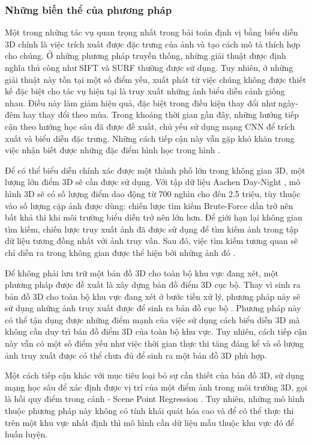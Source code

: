 \subsubsection*{Những biến thể của phương pháp}

Một trong những tác vụ quan trọng nhất trong bài toán định vị bằng biểu diễn 3D chính là việc trích xuất được đặc trưng của ảnh và tạo cách mô tả thích hợp cho chúng. Ở những phương pháp truyền thống, những giải thuật được định nghĩa thủ công như SIFT \cite{lowe2004distinctive} và SURF \cite{bay2006surf} thường được sử dụng. Tuy nhiên, ở những giải thuật này tồn tại một số điểm yếu, xuất phát từ việc chúng không được thiết kế đặc biệt cho tác vụ hiện tại là truy xuất những ảnh biểu diễn cảnh giống nhau. Điều này làm giảm hiệu quả, đặc biệt trong điều kiện thay đổi như ngày-đêm hay thay đổi theo mùa. Trong khoảng thời gian gần đây, những hướng tiếp cận theo hướng học sâu đã được đề xuất, chủ yếu sử dụng mạng CNN để trích xuất và biểu diễn đặc trưng. Những cách tiếp cận này vẫn gặp khó khăn trong việc nhận biết được những đặc điểm hình học trong hình \cite{zhou2020learn}.

Để có thể biểu diễn chính xác được một thành phố lớn trong không gian 3D, một lượng lớn điểm 3D sẽ cần được sử dụng. Với tập dữ liệu Aachen Day-Night \cite{sattler2018benchmarking}, mô hình 3D sẽ có số lượng điểm dao động từ 700 nghìn cho đến 2.5 triệu, tùy thuộc vào số lượng cặp ảnh được dùng: chiến lược tìm kiếm Brute-Force dần trở nên bất khả thi khi môi trường biểu diễn trở nên lớn hơn. Để giới hạn lại không gian tìm kiếm, chiến lược truy xuất ảnh đã được sử dụng để tìm kiếm ảnh trong tập dữ liệu tương đồng nhất với ảnh truy vấn. Sau đó, việc tìm kiếm tương quan sẽ chỉ diễn ra trong không gian được thể hiện bởi những ảnh đó \cite{sarlin2019coarse}.

Để không phải lưu trữ một bản đồ 3D cho toàn bộ khu vực đang xét, một phương pháp được đề xuất là xây dựng bản đồ điểm 3D cục bộ. Thay vì sinh ra bản đồ 3D cho toàn bộ khu vực đang xét ở bước tiền xử lý, phương pháp này sẽ sử dụng những ảnh truy xuất được để sinh ra bản đồ cục bộ \cite{sattler2017large}. Phương pháp này có thể tận dụng được những điểm mạnh của việc sử dụng cách biểu diễn 3D mà không cần duy trì bản đồ điểm 3D của toàn bộ khu vực. Tuy nhiên, cách tiếp cận này vẫn có một số điểm yếu như việc thời gian thực thi tăng đáng kể và số lượng ảnh truy xuất được có thể chưa đủ để sinh ra một bản đồ 3D phù hợp.

Một cách tiếp cận khác với mục tiêu loại bỏ sự cần thiết của bản đồ 3D, sử dụng mạng học sâu để xác định được vị trí của một điểm ảnh trong môi trường 3D, gọi là hồi quy điểm trong cảnh - Scene Point Regression \cite{brachmann2021visual}. Tuy nhiên, những mô hình thuộc phương pháp này không có tính khái quát hóa cao và để có thể thực thi trên một khu vực nhất định thì mô hình cần dữ liệu mẫu thuộc khu vực đó để huấn luyện.
